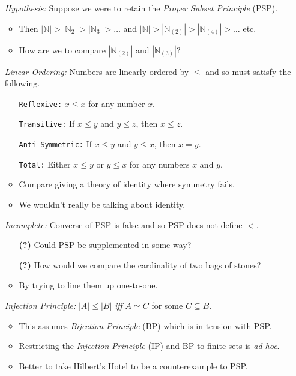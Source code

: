 \documentclass[a4paper, 11pt]{article} %
\newcommand{\abs}[1]{|#1|} %
\newcommand{\N}{\mathbb{N}}
\begin{document}
\begin{enumerate}
  \item[\it Hypothesis:] Suppose we were to retain the \textit{Proper Subset Principle} (PSP).
    \begin{itemize}[leftmargin=-.2in]
      \item Then $\abs{\N}>\abs{\N_{2}}>\abs{\N_{3}}>\ldots$ and $\abs{\N}>\abs{\N_{(2)}}>\abs{\N_{(4)}}>\ldots$ etc. 
      \item How are we to compare $\abs{\N_{(2)}}$ and $\abs{\N_{(3)}}$?
    \end{itemize}
  \item[\it Linear Ordering:] Numbers are linearly ordered by $\leq$ and so must satisfy the following.
    \begin{itemize}[leftmargin=-.2in]
      \item[\tt Reflexive:] $x \leq x$ for any number $x$.
      \item[\tt Transitive:] If $x \leq y$ and $y \leq z$, then $x \leq z$.
      \item[\tt Anti-Symmetric:] If $x \leq y$ and $y \leq x$, then $x = y$.
      \item[\tt Total:] Either $x \leq y$ or $y \leq x$ for any numbers $x$ and $y$.
      \item Compare giving a theory of identity where symmetry fails.
      \item We wouldn't really be talking about identity.
    \end{itemize}
  \item[\it Incomplete:] Converse of PSP is false and so PSP does not define $<$.
    \begin{itemize}[leftmargin=-.2in]
      \item[\bf (?)] Could PSP be supplemented in some way?
      \item[\bf (?)] How would we compare the cardinality of two bags of stones?
      \item By trying to line them up one-to-one.
    \end{itemize}
  \item[\it Injection Principle:] $\abs{A} \leq \abs{B}$ \textit{iff} $A \simeq C$ for some $C\subseteq B$. 
    \begin{itemize}[leftmargin=-.2in]
      \item This assumes \textit{Bijection Principle} (BP) which is in tension with PSP.
      \item Restricting the \textit{Injection Principle} (IP) and BP to finite sets is \textit{ad hoc}.
      \item Better to take Hilbert's Hotel to be a counterexample to PSP.
    \end{itemize}
\end{enumerate}
\end{document}
